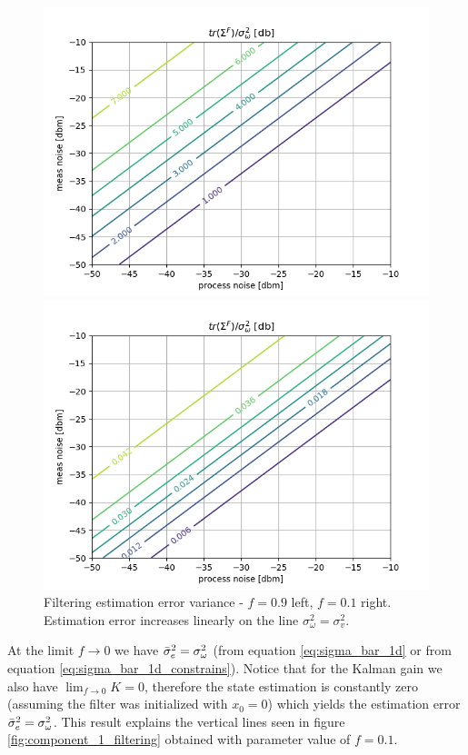 \documentclass[oneside,12pt]{article}
\begin{document}
\begin{figure}[!tbp]
\begin{minipage}[b]{0.45\textwidth}
    \includegraphics[width=\textwidth]{./fig_1d_filt_f09_wrt_noiseVar}
  \end{minipage}  
  \begin{minipage}[b]{0.45\textwidth}
    \includegraphics[width=\textwidth]{./fig_1d_filt_f01_wrt_noiseVar}
  \end{minipage}   
  \caption{\label{fig:fig_1d_filtering}Filtering estimation error variance - $f=0.9$ left, $f=0.1$ right. Estimation error increases linearly on the line $\sigma_\omega^2=\sigma_v^2$.}
\end{figure}
%
At the limit $f \xrightarrow{} 0$ we have $\Bar{\sigma}_e^2 = \sigma_\omega^2$ (from equation \ref{eq:sigma_bar_1d} or from equation \ref{eq:sigma_bar_1d_constrains}). Notice that for the Kalman gain we also have $\operatorname{lim}_{f \xrightarrow{} 0} K = 0$, therefore the state estimation is constantly zero (assuming the filter was initialized with $x_0=0$) which yields the estimation error $\Bar{\sigma}_e^2 = \sigma_\omega^2$. This result explains the vertical lines seen in figure \ref{fig:component_1_filtering} obtained with parameter value of $f=0.1$.\\\\
\end{document}
